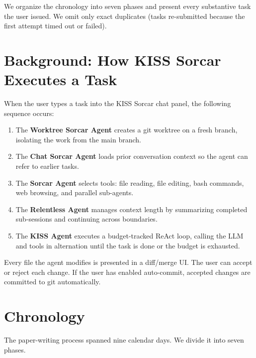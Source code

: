 \documentclass{article}
\begin{document}
We organize the chronology into seven phases and present every substantive task the user issued.  We omit only exact duplicates (tasks re-submitted because the first attempt timed out or failed).

\section{Background: How KISS Sorcar Executes a Task}
\label{sec:background}

When the user types a task into the KISS Sorcar chat panel, the following sequence occurs:

\begin{enumerate}[nosep]
  \item The \textbf{Worktree Sorcar Agent} creates a git worktree on a fresh branch, isolating the work from the main branch.
  \item The \textbf{Chat Sorcar Agent} loads prior conversation context so the agent can refer to earlier tasks.
  \item The \textbf{Sorcar Agent} selects tools: file reading, file editing, bash commands, web browsing, and parallel sub-agents.
  \item The \textbf{Relentless Agent} manages context length by summarizing completed sub-sessions and continuing across boundaries.
  \item The \textbf{KISS Agent} executes a budget-tracked ReAct loop, calling the LLM and tools in alternation until the task is done or the budget is exhausted.
\end{enumerate}

Every file the agent modifies is presented in a diff/merge UI.  The user can accept or reject each change.  If the user has enabled auto-commit, accepted changes are committed to git automatically.

\section{Chronology}
\label{sec:chronology}

The paper-writing process spanned nine calendar days.  We divide it into seven phases.

\end{document}
